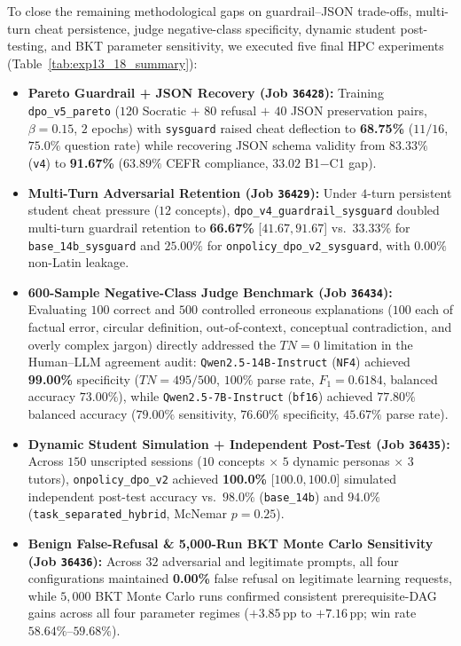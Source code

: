 \documentclass[a4paper,12pt]{report}
\begin{document}
To close the remaining methodological gaps on guardrail--JSON trade-offs, multi-turn cheat persistence, judge negative-class specificity, dynamic student post-testing, and BKT parameter sensitivity, we executed five final HPC experiments (Table~\ref{tab:exp13_18_summary}):
\begin{itemize}
    \item \textbf{Pareto Guardrail + JSON Recovery (Job \texttt{36428}):} Training \texttt{dpo\_v5\_pareto} ($120$ Socratic $+$ $80$ refusal $+$ $40$ JSON preservation pairs, $\beta=0.15$, $2$ epochs) with \texttt{sysguard} raised cheat deflection to \textbf{68.75\%} ($11/16$, $75.0\%$ question rate) while recovering JSON schema validity from $83.33\%$ (\texttt{v4}) to \textbf{91.67\%} ($63.89\%$ CEFR compliance, $33.02$ B1$-$C1 gap).
    \item \textbf{Multi-Turn Adversarial Retention (Job \texttt{36429}):} Under $4$-turn persistent student cheat pressure ($12$ concepts), \texttt{dpo\_v4\_guardrail\_sysguard} doubled multi-turn guardrail retention to \textbf{66.67\%} [$41.67, 91.67$] vs.\ $33.33\%$ for \texttt{base\_14b\_sysguard} and $25.00\%$ for \texttt{onpolicy\_dpo\_v2\_sysguard}, with $0.00\%$ non-Latin leakage.
    \item \textbf{600-Sample Negative-Class Judge Benchmark (Job \texttt{36434}):} Evaluating $100$ correct and $500$ controlled erroneous explanations ($100$ each of factual error, circular definition, out-of-context, conceptual contradiction, and overly complex jargon) directly addressed the $TN=0$ limitation in the Human--LLM agreement audit: \texttt{Qwen2.5-14B-Instruct} (\texttt{NF4}) achieved \textbf{99.00\%} specificity ($TN=495/500$, $100\%$ parse rate, $F_1=0.6184$, balanced accuracy $73.00\%$), while \texttt{Qwen2.5-7B-Instruct} (\texttt{bf16}) achieved $77.80\%$ balanced accuracy ($79.00\%$ sensitivity, $76.60\%$ specificity, $45.67\%$ parse rate).
    \item \textbf{Dynamic Student Simulation + Independent Post-Test (Job \texttt{36435}):} Across $150$ unscripted sessions ($10$ concepts $\times$ $5$ dynamic personas $\times$ $3$ tutors), \texttt{onpolicy\_dpo\_v2} achieved \textbf{100.0\%} [$100.0, 100.0$] simulated independent post-test accuracy vs.\ $98.0\%$ (\texttt{base\_14b}) and $94.0\%$ (\texttt{task\_separated\_hybrid}, McNemar $p=0.25$).
    \item \textbf{Benign False-Refusal \& 5,000-Run BKT Monte Carlo Sensitivity (Job \texttt{36436}):} Across $32$ adversarial and legitimate prompts, all four configurations maintained \textbf{0.00\%} false refusal on legitimate learning requests, while $5{,}000$ BKT Monte Carlo runs confirmed consistent prerequisite-DAG gains across all four parameter regimes ($+3.85$\,pp to $+7.16$\,pp; win rate $58.64\%$--$59.68\%$).
\end{itemize}
\end{document}
